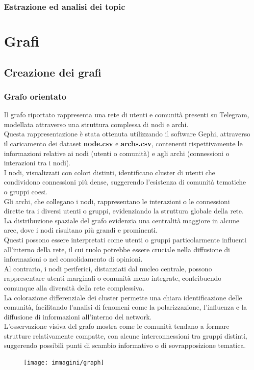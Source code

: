 \documentclass[12pt]{article}
\begin{document}
	\subsubsection{Estrazione ed analisi dei topic}
	\section{Grafi}
	\subsection{Creazione dei grafi}
	\subsubsection{Grafo orientato}
	Il grafo riportato rappresenta una rete di utenti e comunità presenti su Telegram, modellata attraverso una struttura complessa di nodi e archi. \\Questa rappresentazione è stata ottenuta utilizzando il software Gephi, attraverso il caricamento dei dataset \textbf{node.csv} e \textbf{archs.csv}, contenenti rispettivamente le informazioni relative ai nodi (utenti o comunità) e agli archi (connessioni o interazioni tra i nodi). \\I nodi, visualizzati con colori distinti, identificano cluster di utenti che condividono connessioni più dense, suggerendo l'esistenza di comunità tematiche o gruppi coesi. \\Gli archi, che collegano i nodi, rappresentano le interazioni o le connessioni dirette tra i diversi utenti o gruppi, evidenziando la struttura globale della rete.\\
	La distribuzione spaziale del grafo evidenzia una centralità maggiore in alcune aree, dove i nodi risultano più grandi e prominenti.\\ Questi possono essere interpretati come utenti o gruppi particolarmente influenti all'interno della rete, il cui ruolo potrebbe essere cruciale nella diffusione di informazioni o nel consolidamento di opinioni.\\ Al contrario, i nodi periferici, distanziati dal nucleo centrale, possono rappresentare utenti marginali o comunità meno integrate, contribuendo comunque alla diversità della rete complessiva.\\
	La colorazione differenziale dei cluster permette una chiara identificazione delle comunità, facilitando l'analisi di fenomeni come la polarizzazione, l'influenza e la diffusione di informazioni all'interno del network.\\ L'osservazione visiva del grafo mostra come le comunità tendano a formare strutture relativamente compatte, con alcune interconnessioni tra gruppi distinti, suggerendo possibili punti di scambio informativo o di sovrapposizione tematica.
	\begin{figure}[H]
		\centering
		\texttt{[image: immagini/graph]}
	\end{figure}
\end{document}
